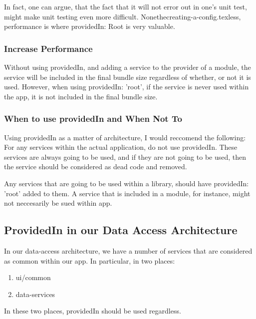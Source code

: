 In fact, one can argue, that the fact that it will not error out in one's unit
test, might make unit testing even more difficult. Nonethecreating-a-config.texless, performance is
where providedIn: Root is very valuable.

\subsubsection{ Increase Performance }
Without using providedIn, and adding a service to the provider of a module, the
service will be included in the final bundle size regardless of whether, or not
it is used. However, when using providedIn: 'root', if the service is never
used within the app, it is not included in the final bundle size.

\subsubsection{ When to use providedIn and When Not To }
Using providedIn as a matter of architecture, I would reccomend the following:
For any services within the actual application, do not use providedIn. These
services are always going to be used, and if they are not going to be used,
then the service should be considered as dead code and removed.

Any services that are going to be used within a library, should have
providedIn: 'root' added to them. A service that is included in a module, for
instance, might not neccesarily be sued within app.

\subsection{ProvidedIn in our Data Access Architecture}
In our data-access architecture, we have a number of services that are
considered as common within our app. In particular, in two places:
\begin{enumerate}
  \item ui/common
  \item data-services
\end{enumerate}

In these two places, providedIn should be used regardless.
